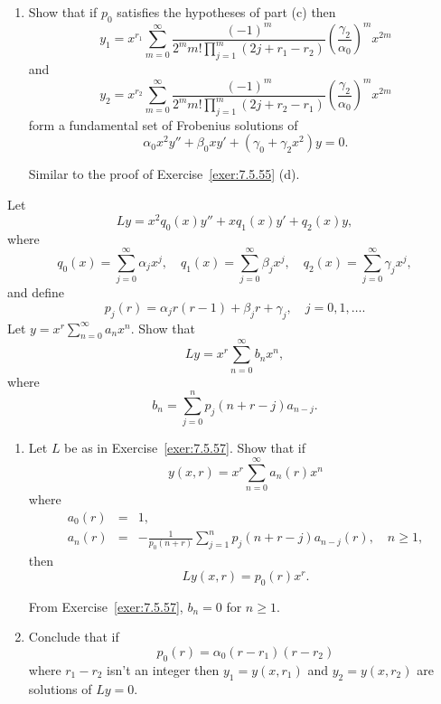 \documentclass{ximera}
\begin{document}
\begin{problem}
\begin{enumerate}
\item %
Show that if $p_0$ satisfies the hypotheses of part (c) then
$$
y_1=x^{r_1}\sum_{m=0}^\infty \frac{(-1)^m}{
2^mm!\prod_{j=1}^m(2j+r_1-r_2)}
\left(\frac{\gamma_2}{\alpha_0}\right)^mx^{2m}
$$
and
$$
y_2=x^{r_2}\sum_{m=0}^\infty \frac{(-1)^m}{
2^mm!\prod_{j=1}^m(2j+r_2-r_1)}
\left(\frac{\gamma_2}{\alpha_0}\right)^mx^{2m}
$$
form a fundamental set of  Frobenius solutions of
$$
\alpha_0x^2y''+\beta_0xy'+(\gamma_0+\gamma_2x^2)y=0.
$$

\begin{solution}
     Similar to the proof of Exercise~\ref{exer:7.5.55} (d).
\end{solution}
\end{enumerate}
\end{problem}

\begin{problem}\label{exer:7.5.57}
 Let
$$
Ly=x^2q_0(x)y''+xq_1(x)y'+q_2(x)y,
$$
where
$$
q_0(x)=\sum_{j=0}^\infty \alpha_jx^j,\quad
q_1(x)=\sum_{j=0}^\infty \beta_jx^j,\quad
q_2(x)=\sum_{j=0}^\infty \gamma_jx^j,
$$
and define
$$
p_j(r)=\alpha_jr(r-1)+\beta_jr+\gamma_j,\quad j=0,1,\dots.
$$
 Let $y=x^r\sum_{n=0}^\infty a_nx^n$. Show that
$$
Ly=x^r\sum_{n=0}^\infty  b_nx^n,
$$
where
$$
b_n=\sum_{j=0}^np_j(n+r-j)a_{n-j}.
$$
\end{problem}

\begin{problem}\label{exer:7.5.58}
\begin{enumerate}
\item %
Let  $L$ be as in Exercise~\ref{exer:7.5.57}. Show that if
$$
y(x,r)=x^r\sum_{n=0}^\infty a_n(r)x^n
$$
where
\begin{eqnarray*}
a_0(r)&=&1,\\
a_n(r)&=&-\frac{1}{p_0(n+r)}\sum_{j=1}^n p_j(n+r-j)a_{n-j}(r),\quad
n\geq 1,
\end{eqnarray*}
then
$$
Ly(x,r)=p_0(r)x^r.
$$

\begin{solution}
    From Exercise~\ref{exer:7.5.57}, $b_n=0$ for $n\geq 1$.
\end{solution}

\item %
Conclude that if
$$
p_0(r)=\alpha_0(r-r_1)(r-r_2)
$$
where $r_1-r_2$ isn't  an integer then $y_1=y(x,r_1)$ and $y_2=y(x,r_2)$
are solutions of $Ly=0$.
\end{enumerate}
\end{problem}
\end{document}

